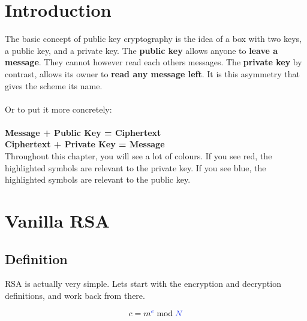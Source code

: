 
\section{Introduction}

	The basic concept of public key cryptography is the idea of a box with two keys, a public key, and a private key. The \textbf{public key} allows anyone to \textbf{leave a message}. They cannot however read each others messages. The \textbf{private key} by contrast, allows its owner to \textbf{read any message left}. It is this asymmetry that gives the scheme its name.\\
	\\
	Or to put	it more concretely:\\
	\\
	\textbf{Message + \textcolor{B}{Public Key} = Ciphertext}\\
	\textbf{Ciphertext + \textcolor{R}{Private Key} = Message}\\

	Throughout this chapter, you will see a lot of colours. If you see \textcolor{R}{red}, the highlighted symbols are relevant to the \textcolor{R}{private key}. If you see \textcolor{B}{blue}, the highlighted symbols are relevant to the \textcolor{B}{public key}.

\section{Vanilla RSA}

	\subsection{Definition}

		RSA is actually very simple. Lets start with the encryption and decryption definitions, and work back from there.

		$$ c = m^{\textcolor{B}{e}} \bmod \textcolor{B}{N} $$

